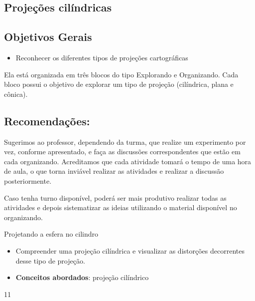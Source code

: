 \clearpage

\def\currentcolor{session1}
\begin{texto}
{
\section*{Projeções cilíndricas}

\subsection*{Objetivos Gerais}

\begin{itemize}
\item Reconhecer os diferentes tipos de projeções cartográficas
\end{itemize}

Ela está organizada em três blocos do tipo Explorando e Organizando. Cada bloco possui o objetivo de explorar um tipo de projeção (cilíndrica, plana e cônica).

\subsection*{Recomendações:}

Sugerimos ao professor, dependendo da turma, que realize um experimento por vez, conforme apresentado, e faça as discussões correspondentes que estão em cada organizando. Acreditamos que cada atividade tomará o tempo de uma hora de aula, o que torna inviável realizar as atividades e realizar a discussão posteriormente.

Caso tenha turno disponível, poderá ser mais produtivo realizar todas as atividades e depois sistematizar as ideias utilizando o material disponível no organizando.
}
\end{texto}
\begin{ObjetivoEsp}{Projetando a esfera no cilindro}
{
  \begin{itemize}
  \item Compreender uma projeção cilíndrica e visualizar as distorções decorrentes desse tipo de projeção.

  \item \textbf{Conceitos abordados}: projeção cilíndrico
  \end{itemize}    
}{1}{1}
\end{ObjetivoEsp}
